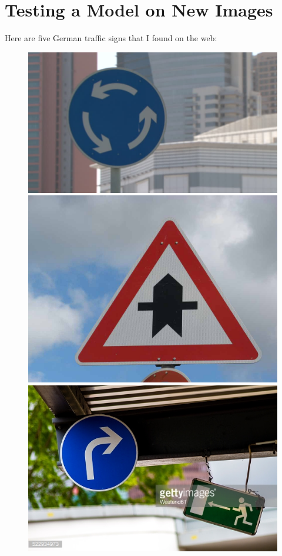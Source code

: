 \documentclass[12pt]{article}
\begin{document}
\section{Testing a Model on New Images}
Here are five German traffic signs that I found on the web:
\begin{figure}[!h]
\includegraphics[scale = 0.3]{traffic-signs-data/9.jpg}
\includegraphics[scale = 0.2]{traffic-signs-data/100_1607.jpg}
\includegraphics[scale = 2]{traffic-signs-data/522934973.jpg}

\end{figure}
\end{document}
